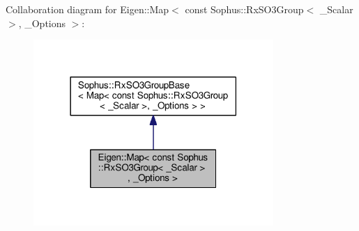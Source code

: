 Collaboration diagram for Eigen\+:\+:Map$<$ const Sophus\+:\+:Rx\+S\+O3\+Group$<$ \+\_\+\+Scalar $>$, \+\_\+\+Options $>$\+:
\nopagebreak
\begin{figure}[H]
\begin{center}
\leavevmode
\includegraphics[width=258pt]{class_eigen_1_1_map_3_01const_01_sophus_1_1_rx_s_o3_group_3_01___scalar_01_4_00_01___options_01_4__coll__graph}
\end{center}
\end{figure}
